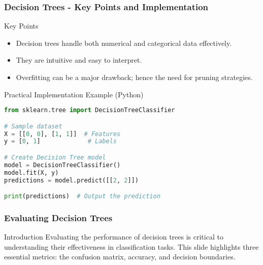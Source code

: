 \documentclass[aspectratio=169]{beamer}
\begin{document}
\begin{frame}[fragile]
    \frametitle{Decision Trees - Key Points and Implementation}
    \begin{block}{Key Points}
        \begin{itemize}
            \item Decision trees handle both numerical and categorical data effectively.
            \item They are intuitive and easy to interpret.
            \item Overfitting can be a major drawback; hence the need for pruning strategies.
        \end{itemize}
    \end{block}
    
    \begin{block}{Practical Implementation Example (Python)}
        \begin{lstlisting}[language=Python]
from sklearn.tree import DecisionTreeClassifier

# Sample dataset
X = [[0, 0], [1, 1]]  # Features
y = [0, 1]             # Labels

# Create Decision Tree model
model = DecisionTreeClassifier()
model.fit(X, y)
predictions = model.predict([[2, 2]])

print(predictions)  # Output the prediction
        \end{lstlisting}
    \end{block}
\end{frame}

\begin{frame}[fragile]
    \frametitle{Evaluating Decision Trees}
    \begin{block}{Introduction}
        Evaluating the performance of decision trees is critical to understanding their effectiveness in classification tasks.
        This slide highlights three essential metrics: the confusion matrix, accuracy, and decision boundaries.
    \end{block}
\end{frame}
\end{document}
